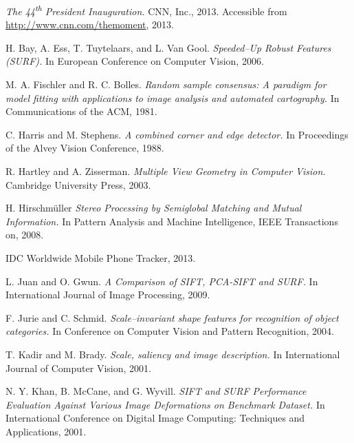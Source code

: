 
\def\bibname{Bibliography}
\begin{thebibliography}{99}
\addcontentsline{toc}{chapter}{\bibname}

  \emph{The 44\textsuperscript{th} President Inauguration.}
  CNN, Inc., 2013. Accessible from \url{http://www.cnn.com/themoment}, 2013.

  {\sc  H. Bay, A. Ess, T. Tuytelaars, and L. Van Gool.}
  \emph{Speeded–Up Robust Features (SURF).}
  In European Conference on Computer Vision, 2006.

  {\sc M. A. Fischler and R. C. Bolles.} 
  \emph{Random sample consensus: A paradigm for model fitting with applications to image analysis and automated cartography.} 
  In Communications of the ACM, 1981.

  {\sc C. Harris and M. Stephens.} 
  \emph{A combined corner and edge detector.}
  In Proceedings of the Alvey Vision Conference, 1988.

  {\sc  R. Hartley and A. Zisserman.}
  \emph{Multiple View Geometry in Computer Vision.}
  Cambridge University Press, 2003.

  {\sc  H. Hirschmüller}
  \emph{Stereo Processing by Semiglobal Matching and Mutual Information.}
  In Pattern Analysis and Machine Intelligence, IEEE Transactions on, 2008.

  IDC Worldwide Mobile Phone Tracker, 2013.

  {\sc L. Juan and O. Gwun.} 
  \emph{A Comparison of SIFT, PCA-SIFT and SURF.}
  In International Journal of Image Processing, 2009.

  {\sc F. Jurie and C. Schmid.} 
  \emph{Scale–invariant shape features for recognition of object categories.}
  In Conference on Computer Vision and Pattern Recognition, 2004.

  {\sc T. Kadir and M. Brady.} 
  \emph{Scale, saliency and image description.}
  In International Journal of Computer Vision, 2001.

  {\sc N. Y. Khan, B. McCane, and G. Wyvill.} 
  \emph{SIFT and SURF Performance Evaluation Against Various Image Deformations on Benchmark Dataset.}
  In International Conference on Digital Image Computing: Techniques and Applications, 2001.


\end{thebibliography}
